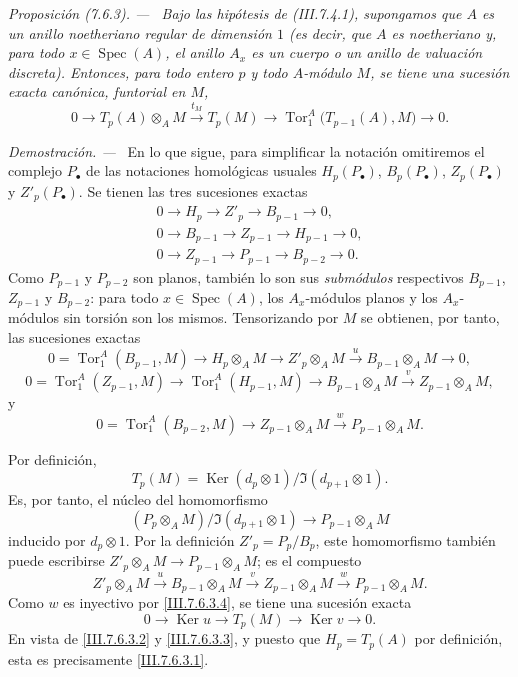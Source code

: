 \documentclass[10pt,oneside]{book}
\newcommand{\Spec}{\operatorname{Spec}}
\newcommand{\Tor}{\operatorname{Tor}}
\newcommand{\Ker}{\operatorname{Ker}}
\newcommand{\sref}[2][]{\textup{(#2)}}
\newenvironment{proposition}[1][]{\par\medskip\noindent\itshape Proposición (#1). ---\ }{\par}
\newenvironment{proof}{\par\medskip\noindent\textit{Demostración. ---\ }}{\par}
\begin{document}
\begin{proposition}[7.6.3]
\label{III.7.6.3}
Bajo las hipótesis de \textup{\sref{III.7.4.1}}, supongamos que $A$ es un
anillo noetheriano regular de dimensión $1$ (es decir, que $A$ es
noetheriano y, para todo $x\in\Spec(A)$, el anillo $A_x$ es un cuerpo
o un anillo de valuación discreta). Entonces, para todo entero $p$ y
todo $A$-módulo $M$, se tiene una sucesión exacta canónica, funtorial
en $M$,
\[
  0
  \longrightarrow T_p(A)\otimes_A M
  \xrightarrow{t_M} T_p(M)
  \longrightarrow
  \Tor_1^A\bigl(T_{p-1}(A),M\bigr)
  \longrightarrow 0.
  \tag{7.6.3.1}\label{III.7.6.3.1}
\]
\end{proposition}

\begin{proof}
En lo que sigue, para simplificar la notación omitiremos el complejo
$P_\bullet$ de las notaciones homológicas usuales
$H_p(P_\bullet)$, $B_p(P_\bullet)$, $Z_p(P_\bullet)$ y
$Z'_p(P_\bullet)$. Se tienen las tres sucesiones exactas
\begin{gather*}
  0\longrightarrow H_p\longrightarrow Z'_p
  \longrightarrow B_{p-1}\longrightarrow 0,\\
  0\longrightarrow B_{p-1}\longrightarrow Z_{p-1}
  \longrightarrow H_{p-1}\longrightarrow 0,\\
  0\longrightarrow Z_{p-1}\longrightarrow P_{p-1}
  \longrightarrow B_{p-2}\longrightarrow 0.
\end{gather*}
Como $P_{p-1}$ y $P_{p-2}$ son planos, también lo son sus
\emph{submódulos} respectivos $B_{p-1}$, $Z_{p-1}$ y $B_{p-2}$: para todo
$x\in\Spec(A)$, los $A_x$-módulos planos y los $A_x$-módulos sin
torsión son los mismos. Tensorizando por $M$ se obtienen, por tanto,
las sucesiones exactas
\[
  0=\Tor_1^A(B_{p-1},M)
  \longrightarrow H_p\otimes_A M
  \longrightarrow Z'_p\otimes_A M
  \xrightarrow{u}B_{p-1}\otimes_A M
  \longrightarrow 0,
  \tag{7.6.3.2}\label{III.7.6.3.2}
\]
\[
  0=\Tor_1^A(Z_{p-1},M)
  \longrightarrow \Tor_1^A(H_{p-1},M)
  \longrightarrow B_{p-1}\otimes_A M
  \xrightarrow{v} Z_{p-1}\otimes_A M,
  \tag{7.6.3.3}\label{III.7.6.3.3}
\]
y
\[
  0=\Tor_1^A(B_{p-2},M)
  \longrightarrow Z_{p-1}\otimes_A M
  \xrightarrow{w}P_{p-1}\otimes_A M.
  \tag{7.6.3.4}\label{III.7.6.3.4}
\]

Por definición,
\[
  T_p(M)=
  \Ker(d_p\otimes 1)/\Im(d_{p+1}\otimes 1).
\]
Es, por tanto, el núcleo del homomorfismo
\[
  (P_p\otimes_A M)/\Im(d_{p+1}\otimes 1)
  \longrightarrow P_{p-1}\otimes_A M
\]
inducido por $d_p\otimes 1$. Por la definición
$Z'_p=P_p/B_p$, este homomorfismo también puede escribirse
$Z'_p\otimes_A M\to P_{p-1}\otimes_A M$; es el compuesto
\[
  Z'_p\otimes_A M
  \xrightarrow{u}B_{p-1}\otimes_A M
  \xrightarrow{v}Z_{p-1}\otimes_A M
  \xrightarrow{w}P_{p-1}\otimes_A M.
\]
Como $w$ es inyectivo por \eqref{III.7.6.3.4}, se tiene una sucesión
exacta
\[
  0\longrightarrow\Ker u\longrightarrow T_p(M)
  \longrightarrow\Ker v\longrightarrow 0.
\]
En vista de \eqref{III.7.6.3.2} y \eqref{III.7.6.3.3}, y puesto que
$H_p=T_p(A)$ por definición, esta es precisamente
\eqref{III.7.6.3.1}.
\end{proof}
\end{document}

